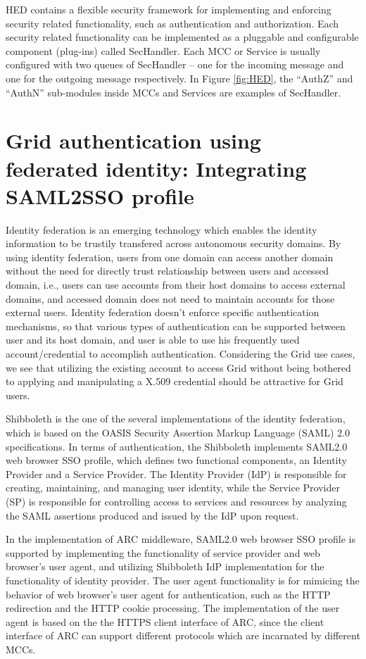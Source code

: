 \documentclass[conference]{IEEEtran}
\begin{document}
HED contains a flexible security framework for implementing and enforcing security 
related functionality, such as authentication and authorization. 
Each security related functionality can be implemented as a pluggable and configurable 
component (plug-ins) called SecHandler. Each MCC or Service is usually configured with 
two queues of SecHandler -- one for the incoming message and one for the outgoing message 
respectively. In Figure \ref{fig:HED}, the ``AuthZ'' and ``AuthN'' sub-modules inside 
MCCs and Services are examples of SecHandler.

\section{Grid authentication using federated identity: Integrating SAML2SSO profile}
\label{sec:intergrationSAML2SSO}
Identity federation is an emerging technology which enables the identity information to be 
trustily transfered across autonomous security domains. By using identity federation, users 
from one domain can access another domain without the need for directly trust relationship 
between users and accessed domain, i.e., users can use accounts from their host domains to 
access external domains, and accessed domain does not need to maintain accounts for those 
external users. Identity federation doesn't enforce specific authentication mechanisms, so 
that various types of authentication can be supported between user and its host domain, and 
user is able to use his frequently used account/credential to accomplish authentication. 
Considering the Grid use cases, we see that utilizing the existing account to access Grid 
without being bothered to applying and manipulating a X.509 credential should be attractive 
for Grid users.

Shibboleth is the one of the several implementations of the identity federation, which is 
based on the OASIS Security Assertion Markup Language (SAML) 2.0 specifications. In terms 
of authentication, the Shibboleth implements SAML2.0 web browser SSO profile, which  defines 
two functional components, an Identity Provider and a Service Provider. The Identity Provider 
(IdP) is responsible for creating, maintaining, and managing user identity, while the Service 
Provider (SP) is responsible for controlling access to services and resources by analyzing 
the SAML assertions produced and issued by the IdP upon request.

In the implementation of ARC middleware, SAML2.0 web browser SSO profile is supported by 
implementing the functionality of service provider and web browser's user agent, and utilizing 
Shibboleth IdP implementation for the functionality of identity provider. The user agent 
functionality is for mimicing the behavior of web browser's user agent for authentication, 
such as the HTTP redirection and the HTTP cookie processing. The implementation of the user 
agent is based on the the HTTPS client interface of ARC, since the client interface of ARC 
can support different protocols which are incarnated by different MCCs.
\end{document}
